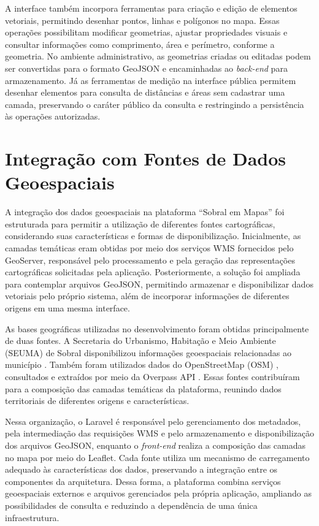 A interface também incorpora ferramentas para criação e edição de elementos vetoriais, permitindo desenhar pontos, linhas e polígonos no mapa. Essas operações possibilitam modificar geometrias, ajustar propriedades visuais e consultar informações como comprimento, área e perímetro, conforme a geometria. No ambiente administrativo, as geometrias criadas ou editadas podem ser convertidas para o formato GeoJSON e encaminhadas ao \textit{back-end} para armazenamento. Já as ferramentas de medição na interface pública permitem desenhar elementos para consulta de distâncias e áreas sem cadastrar uma camada, preservando o caráter público da consulta e restringindo a persistência às operações autorizadas.

\section{Integração com Fontes de Dados Geoespaciais}
\label{sec:integracao-geoserver}

A integração dos dados geoespaciais na plataforma ``Sobral em Mapas'' foi estruturada para permitir a utilização de diferentes fontes cartográficas, considerando suas características e formas de disponibilização. Inicialmente, as camadas temáticas eram obtidas por meio dos serviços WMS fornecidos pelo GeoServer, responsável pelo processamento e pela geração das representações cartográficas solicitadas pela aplicação. Posteriormente, a solução foi ampliada para contemplar arquivos GeoJSON, permitindo armazenar e disponibilizar dados vetoriais pelo próprio sistema, além de incorporar informações de diferentes origens em uma mesma interface.

As bases geográficas utilizadas no desenvolvimento foram obtidas principalmente de duas fontes. A Secretaria do Urbanismo, Habitação e Meio Ambiente (SEUMA) de Sobral disponibilizou informações geoespaciais relacionadas ao município \cite{SEUMADadosGeograficos}. Também foram utilizados dados do OpenStreetMap (OSM) \cite{OpenStreetMapDados}, consultados e extraídos por meio da Overpass API \cite{OverpassAPI}. Essas fontes contribuíram para a composição das camadas temáticas da plataforma, reunindo dados territoriais de diferentes origens e características.

Nessa organização, o Laravel é responsável pelo gerenciamento dos metadados, pela intermediação das requisições WMS e pelo armazenamento e disponibilização dos arquivos GeoJSON, enquanto o \textit{front-end} realiza a composição das camadas no mapa por meio do Leaflet. Cada fonte utiliza um mecanismo de carregamento adequado às características dos dados, preservando a integração entre os componentes da arquitetura. Dessa forma, a plataforma combina serviços geoespaciais externos e arquivos gerenciados pela própria aplicação, ampliando as possibilidades de consulta e reduzindo a dependência de uma única infraestrutura.

